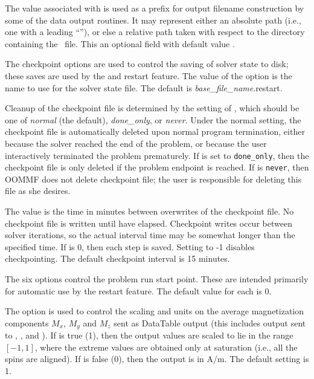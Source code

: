 \begin{description}
The value associated with  is used as a prefix for
output filename construction by some of the data output routines.  It
may represent either an absolute path (i.e., one with a leading
``\fs''), or else a relative path taken with respect to the directory
containing the \MIF\ file.  This an optional field with default value
.

The checkpoint options are used to control the saving of solver state
to disk; these saves are used by the  and  restart
feature.  The value of the  option is the
name to use for the solver state file.  The default is
\textit{base\_file\_name}.restart.

Cleanup of the checkpoint file is determined by the setting of
, which should be one of
\textit{normal} (the default), \textit{done\_only}, or \textit{never}.
Under the normal setting, the checkpoint file is automatically deleted
upon normal program termination, either because the solver reached the end
of the problem, or because the user interactively terminated the problem
prematurely.  If  is set to
\texttt{done\_only}, then the checkpoint file is only deleted if the
problem endpoint is reached.  If  is
\texttt{never}, then OOMMF does not delete checkpoint file; the
user is responsible for deleting this file as she desires.

The  value is the time in minutes between
overwrites of the checkpoint file.  No checkpoint file is written until
 have elapsed.  Checkpoint writes occur
between solver iterations, so the actual interval time may be somewhat
longer than the specified time.  If  is 0,
then each step is saved.  Setting  to -1
disables checkpointing.  The default checkpoint interval is 15 minutes.

The six  options control the problem run start point.
These are intended primarily for automatic use by the restart feature.
The default value for each is 0.

The  option is used to control the
scaling and units on the average magnetization components $M_x$, $M_y$
and $M_z$ sent as DataTable output (this includes output sent to
,
, and
).  If
 is true (1), then the output values are scaled to lie
in the range $[-1,1]$, where the extreme values are obtained only at
saturation (i.e., all the spins are aligned).  If  is
false (0), then the output is in A/m.  The default setting is 1.


\end{description}
